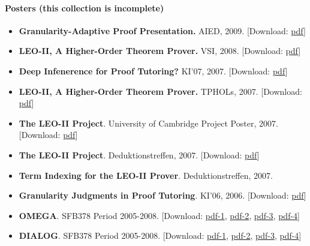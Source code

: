 \documentclass{article}
\newcommand{\tmstrong}[1]{\textbf{#1}}
\newcommand{\tmtextbf}[1]{{\bfseries{#1}}}
\newcommand{\tmtextit}[1]{{\itshape{#1}}}
\newenvironment{itemizedot}{\begin{itemize} \renewcommand{\labelitemi}{$\bullet$}\renewcommand{\labelitemii}{$\bullet$}\renewcommand{\labelitemiii}{$\bullet$}\renewcommand{\labelitemiv}{$\bullet$}}{\end{itemize}}
\begin{document}
\paragraph{Posters (this collection is incomplete)}

\begin{itemizedot}
  \item {\tmstrong{Granularity-Adaptive Proof Presentation.}} AIED, 2009.
  {\color{grey} [Download: {\small
  \href{../papers/poster-AIED-2009.pdf}{pdf}}]}
  
  \item {\tmstrong{LEO-II, A Higher-Order Theorem Prover.}} VSI, 2008.
  {\color{grey} [Download: {\small
  \href{../papers/poster-VSI-2008.pdf}{pdf}}]}
  
  \item \tmtextbf{Dee{\tmstrong{}}p Infenerence for Proof Tutoring?} KI'07,
  2007. {\color{grey} [Download: {\small
  \href{../papers/poster-ki-07.pdf}{pdf}}]}
  
  \item {\tmstrong{LEO-II, A Higher-Order Theorem Prover.}} TPHOLs, 2007.
  {\color{grey} [Download: {\small
  \href{../papers/poster-leo-TPHOLs-2007.pdf}{pdf}}]}
  
  \item \tmtextbf{The LEO-II Project}. University of Cambridge Project Poster,
  2007. {\color{grey} [Download: {\small
  \href{../papers/poster-leo-II.pdf}{pdf}}]}
  
  \item \tmtextbf{The LEO-II Project}. Deduktionstreffen, 2007. {\color{grey}
  [Download: {\small \href{../papers/poster-dedsys07-I.pdf}{pdf}}]}
  
  \item \tmtextbf{Term Indexing for the LEO-II Prover}. Deduktionstreffen,
  2007.
  
  \item {\small \tmtextit{}\tmtextbf{Granularity Judgments in Proof
  Tutoring}. KI'06, 2006. {\color{grey} [Download:
  \href{../papers/poster-ki-06.pdf}{pdf}]}}
  
  \item {\small \tmtextit{}\tmtextbf{OMEGA}. SFB378 Period 2005-2008.
  {\color{grey} [Download: \href{../papers/poster-omega-05-a.pdf}{pdf-1},
  \href{../papers/poster-omega-05-b.pdf}{pdf-2},
  \href{../papers/poster-omega-05-c.pdf}{pdf-3},
  \href{../papers/poster-omega-05-d.pdf}{pdf-4}]}}
  
  \item {\small \tmtextit{}\tmtextbf{DIALOG}. SFB378 Period 2005-2008.
  }{\color{grey} [Download: {\small
  \href{../papers/poster-dialog-05-a.pdf}{pdf-1}}, {\small
  \href{../papers/poster-dialog-05-b.pdf}{pdf-2}}, {\small
  \href{../papers/poster-dialog-05-c.pdf}{pdf-3}}, {\small
  \href{../papers/poster-dialog-05-d.pdf}{pdf-4}}]}
  

\end{itemizedot}
\end{document}
